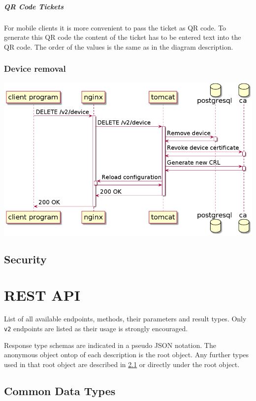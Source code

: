 \documentclass[12pt]{report}
\begin{document}
\paragraph{QR Code Tickets}
For mobile clients it is more convenient to pass the ticket as QR code. To generate this QR code the content of the ticket has to be
entered text into the QR code. The order of the values is the same as in the diagram description. 

\subsection{Device removal}

\includegraphics[width=\linewidth]{diagrams/remove-device.png}

\section{Security}

\chapter{REST API}

List of all available endpoints, methods, their parameters and result types. 
Only \texttt{v2} endpoints are listed as their usage is strongly encouraged.

Response type schemas are indicated in a pseudo JSON notation. The anonymous
object ontop of each description is the root object. Any further types used
in that root object are described in \ref{common-data-structures} or directly
under the root object.

\section{Common Data Types}\label{common-data-structures}
\end{document}
